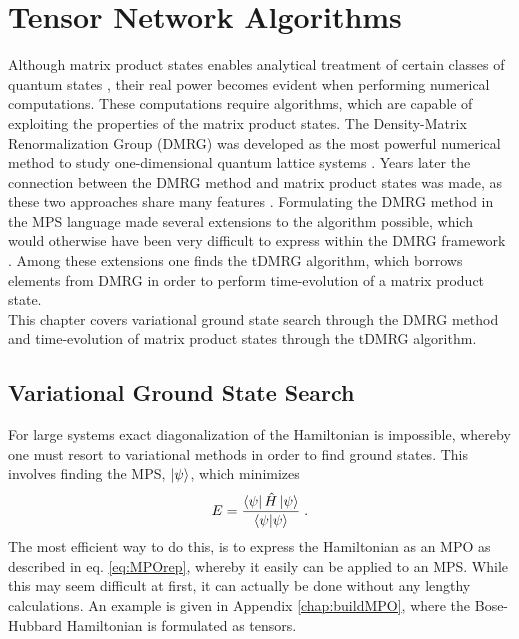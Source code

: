 \chapter{Tensor Network Algorithms}
Although matrix product states enables analytical treatment of certain classes of quantum states \cite{Baxter1968,Affleck1987}, their real power becomes evident when performing numerical computations. These computations require algorithms, which are capable of exploiting the properties of the matrix product states. The Density-Matrix Renormalization Group (DMRG) was developed as the most powerful numerical method to study one-dimensional quantum lattice systems \cite{White1992,White1993}. Years later the connection between the DMRG method and matrix product states was made, as these two approaches share many features \cite{Ostlund1995, Dukelsky1998}. Formulating the DMRG method in the MPS language made several extensions to the algorithm possible, which would otherwise have been very difficult to express within the DMRG framework \cite{schollwock}. Among these extensions one finds the tDMRG algorithm, which borrows elements from DMRG in order to perform time-evolution of a matrix product state.\\
This chapter covers variational ground state search through the DMRG method and time-evolution of matrix product states through the tDMRG algorithm.


\section{Variational Ground State Search}
For large systems exact diagonalization of the Hamiltonian is impossible, whereby one must resort to variational methods in order to find ground states. This involves finding the MPS, $\ket{\psi}$, which minimizes
\begin{equation}
	E = \frac{\bra{\psi} \hat{H} \ket{\psi}}{\braket{\psi | \psi}} \; .
\end{equation}
The most efficient way to do this, is to express the Hamiltonian as an MPO as described in eq. \eqref{eq:MPOrep}, whereby it easily can be applied to an MPS. While this may seem difficult at first, it can actually be done without any lengthy calculations. An example is given in Appendix \ref{chap:buildMPO}, where the Bose-Hubbard Hamiltonian is formulated as tensors.

